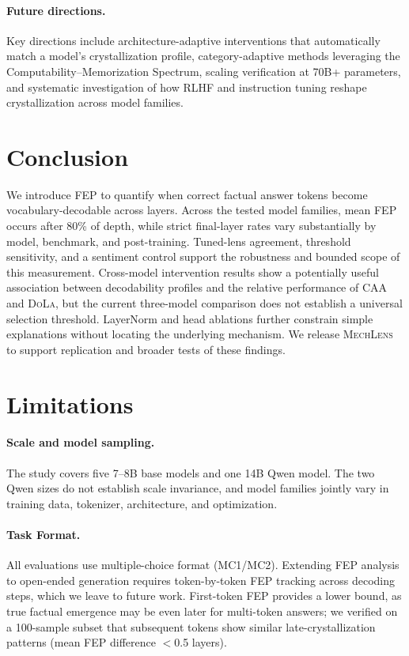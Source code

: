 \documentclass[11pt]{article}
\newcommand{\mechlens}{\textsc{MechLens}}
\newcommand{\dola}{\textsc{DoLa}}
\newcommand{\caa}{\textsc{CAA}}
\begin{document}
\paragraph{Future directions.} Key directions include architecture-adaptive interventions that automatically match a model's crystallization profile, category-adaptive methods leveraging the Computability--Memorization Spectrum, scaling verification at 70B+ parameters, and systematic investigation of how RLHF and instruction tuning reshape crystallization across model families.

\section{Conclusion}

We introduce FEP to quantify when correct factual answer tokens become vocabulary-decodable across layers. Across the tested model families, mean FEP occurs after 80\% of depth, while strict final-layer rates vary substantially by model, benchmark, and post-training. Tuned-lens agreement, threshold sensitivity, and a sentiment control support the robustness and bounded scope of this measurement. Cross-model intervention results show a potentially useful association between decodability profiles and the relative performance of \caa{} and \dola{}, but the current three-model comparison does not establish a universal selection threshold. LayerNorm and head ablations further constrain simple explanations without locating the underlying mechanism. We release \mechlens{} to support replication and broader tests of these findings.

\section*{Limitations}

\paragraph{Scale and model sampling.} The study covers five 7--8B base models and one 14B Qwen model. The two Qwen sizes do not establish scale invariance, and model families jointly vary in training data, tokenizer, architecture, and optimization.

\paragraph{Task Format.} All evaluations use multiple-choice format (MC1/MC2). Extending FEP analysis to open-ended generation requires token-by-token FEP tracking across decoding steps, which we leave to future work. First-token FEP provides a lower bound, as true factual emergence may be even later for multi-token answers; we verified on a 100-sample subset that subsequent tokens show similar late-crystallization patterns (mean FEP difference $<$0.5 layers).
\end{document}
